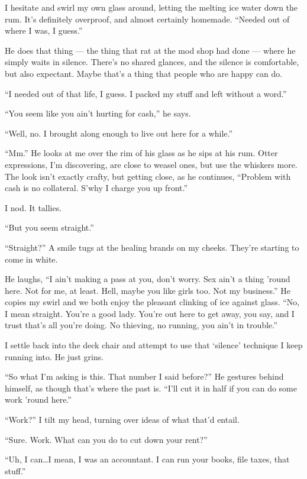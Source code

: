 I hesitate and swirl my own glass around, letting the melting ice water down the rum. It's definitely overproof, and almost certainly homemade. ``Needed out of where I was, I guess.''

He does that thing --- the thing that rat at the mod shop had done --- where he simply waits in silence. There's no shared glances, and the silence is comfortable, but also expectant. Maybe that's a thing that people who are happy can do.

``I needed out of that life, I guess. I packed my stuff and left without a word.''

``You seem like you ain't hurting for cash,'' he says.

``Well, no. I brought along enough to live out here for a while.''

``Mm.'' He looks at me over the rim of his glass as he sips at his rum. Otter expressions, I'm discovering, are close to weasel ones, but use the whiskers more. The look isn't exactly crafty, but getting close, as he continues, ``Problem with cash is no collateral. S'why I charge you up front.''

I nod. It tallies.

``But you seem straight.''

``Straight?'' A smile tugs at the healing brands on my cheeks. They're starting to come in white.

He laughs, ``I ain't making a pass at you, don't worry. Sex ain't a thing 'round here. Not for me, at least. Hell, maybe you like girls too. Not my business.'' He copies my swirl and we both enjoy the pleasant clinking of ice against glass. ``No, I mean straight. You're a good lady. You're out here to get away, you say, and I trust that's all you're doing. No thieving, no running, you ain't in trouble.''

I settle back into the deck chair and attempt to use that `silence' technique I keep running into. He just grins.

``So what I'm asking is this. That number I said before?'' He gestures behind himself, as though that's where the past is. ``I'll cut it in half if you can do some work 'round here.''

``Work?'' I tilt my head, turning over ideas of what that'd entail.

``Sure. Work. What can you do to cut down your rent?''

``Uh, I can\ldots{}I mean, I was an accountant. I can run your books, file taxes, that stuff.''

